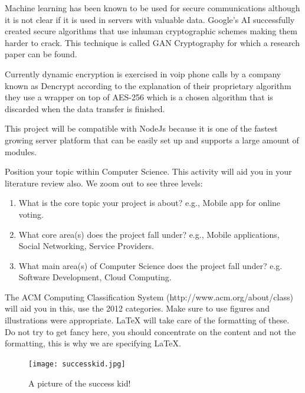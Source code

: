 %
%
%
%






%
%
%
%
Machine learning has been known to be used for secure communications although it is not clear if it is used in servers with valuable data. Google's AI successfully created secure algorithms \cite{GoogleAi1} that use inhuman cryptographic schemes making them harder to crack. This technique is called GAN Cryptography \cite{GoogleAi2} for which a research paper can be found.

Currently dynamic encryption is exercised in voip phone calls by a company known as Dencrypt \cite{dencrypt} according to the explanation of their proprietary algorithm they use a wrapper on top of AES-256 which is a chosen algorithm that is discarded when the data transfer is finished.


This project will be compatible with NodeJs because it is one of the fastest growing server platform \cite{NodeJs} that can be easily set up and supports a large amount of modules.

%
%
%
%


Position your topic within Computer Science. This activity will aid you in your literature review also. We zoom out to see three levels:

\begin{enumerate}
    \item What is the core topic your project is about? e.g., Mobile app for online voting.
    \item What core area(s) does the project fall under? e.g., Mobile applications, Social Networking, Service Providers. 
    \item What main area(s) of Computer Science does the project fall under? e.g. Software Development, Cloud Computing.
\end{enumerate}

The ACM Computing Classification System (http://www.acm.org/about/class) will aid you in this, use the 2012 categories. Make sure to use figures and illustrations were appropriate. LaTeX will take care of the formatting of these. Do not try to get fancy here, you should concentrate on the content and not the formatting, this is why we are specifying LaTeX.

\begin{figure}[ht]
  \centering
      \texttt{[image: successkid.jpg]}
  \caption[A picture of the success kid!]{A picture of the success kid!\cite{Reference1}}
  \label{fig:successkid}
\end{figure}

